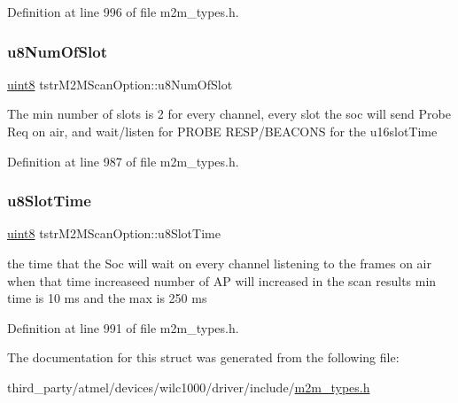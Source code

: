 Definition at line 996 of file m2m\+\_\+types.\+h.

\mbox{\label{structtstrM2MScanOption_afea8abd511d36669abe3f62db32448fd}} 
\subsubsection{\texorpdfstring{u8\+Num\+Of\+Slot}{u8NumOfSlot}}
{\footnotesize\ttfamily \hyperlink{group__DataT_ga4df709a77647e870bbf1d955b8edc9a6}{uint8} tstr\+M2\+M\+Scan\+Option\+::u8\+Num\+Of\+Slot}

The min number of slots is 2 for every channel, every slot the soc will send Probe Req on air, and wait/listen for P\+R\+O\+BE R\+E\+S\+P/\+B\+E\+A\+C\+O\+NS for the u16slot\+Time 

Definition at line 987 of file m2m\+\_\+types.\+h.

\mbox{\label{structtstrM2MScanOption_a059c3a0366f0f96c3ad371edf7ebee43}} 
\subsubsection{\texorpdfstring{u8\+Slot\+Time}{u8SlotTime}}
{\footnotesize\ttfamily \hyperlink{group__DataT_ga4df709a77647e870bbf1d955b8edc9a6}{uint8} tstr\+M2\+M\+Scan\+Option\+::u8\+Slot\+Time}

the time that the Soc will wait on every channel listening to the frames on air when that time increaseed number of AP will increased in the scan results min time is 10 ms and the max is 250 ms 

Definition at line 991 of file m2m\+\_\+types.\+h.



The documentation for this struct was generated from the following file\+:\begin{DoxyCompactItemize}
\item 
third\+\_\+party/atmel/devices/wilc1000/driver/include/\hyperlink{m2m__types_8h}{m2m\+\_\+types.\+h}\end{DoxyCompactItemize}
